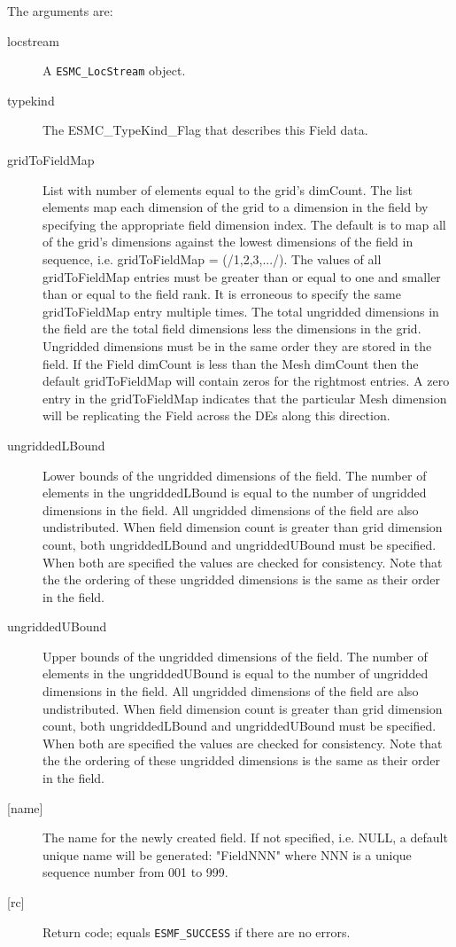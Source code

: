     The arguments are:
    \begin{description}
    \item[locstream]
      A {\tt ESMC\_LocStream} object.
    \item[typekind]
      The ESMC\_TypeKind\_Flag that describes this Field data.
    \item[gridToFieldMap]
      List with number of elements equal to the grid's dimCount. The list
      elements map each dimension of the grid to a dimension in the field by
      specifying the appropriate field dimension index. The default is to map all of
      the grid's dimensions against the lowest dimensions of the field in sequence,
      i.e. gridToFieldMap = (/1,2,3,.../). The values of all gridToFieldMap entries
      must be greater than or equal to one and smaller than or equal to the field
      rank. It is erroneous to specify the same gridToFieldMap entry multiple times.
      The total ungridded dimensions in the field  are the total field dimensions
      less the dimensions in the grid. Ungridded dimensions must be in the same order
      they are stored in the field. If the Field dimCount is less than the Mesh
      dimCount then the default gridToFieldMap will contain zeros for the rightmost
      entries. A zero entry in the gridToFieldMap indicates that the particular Mesh
      dimension will be replicating the Field across the DEs along this direction.
    \item[ungriddedLBound]
      Lower bounds of the ungridded dimensions of the field. The number of elements
      in the ungriddedLBound is equal to the number of ungridded dimensions in the
      field. All ungridded dimensions of the field are also undistributed. When field
      dimension count is greater than grid dimension count, both ungriddedLBound and
      ungriddedUBound must be specified. When both are specified the values are
      checked for consistency. Note that the the ordering of these ungridded
      dimensions is the same as their order in the field.  
    \item[ungriddedUBound]
      Upper bounds of the ungridded dimensions of the field. The number of elements
      in the ungriddedUBound is equal to the number of ungridded dimensions in the
      field. All ungridded dimensions of the field are also undistributed. When field
      dimension count is greater than grid dimension count, both ungriddedLBound and
      ungriddedUBound must be specified. When both are specified the values are
      checked for consistency. Note that the the ordering of these ungridded
      dimensions is the same as their order in the field.  
    \item[{[name]}]
      The name for the newly created field.  If not specified, i.e. NULL,
      a default unique name will be generated: "FieldNNN" where NNN
      is a unique sequence number from 001 to 999.
    \item[{[rc]}]
      Return code; equals {\tt ESMF\_SUCCESS} if there are no errors.
    \end{description}
   

